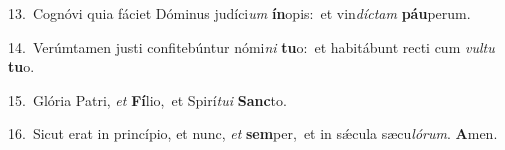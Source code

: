 {\numbfont\textcolor{\numbcolor}{13.}}~Cognóvi quia fáciet Dóminus judíci\textit{um} \textbf{ín}\-opis:~\star et vin\-\textit{díc}\-\textit{tam} \textbf{páu}\-perum.\par
{\numbfont\textcolor{\numbcolor}{14.}}~Verúmtamen justi confitebúntur nómi\textit{ni} \textbf{tu}\-o:~\star et habitábunt recti cum \textit{vul}\-\textit{tu} \textbf{tu}\-o.\par
{\numbfont\textcolor{\numbcolor}{15.}}~Glória Patri, \textit{et} \textbf{Fí}\-lio,~\star et Spirí\-\textit{tu}\-\textit{i} \textbf{Sanc}\-to.\par
{\numbfont\textcolor{\numbcolor}{16.}}~Sicut erat in princípio, et nunc, \textit{et} \textbf{sem}\-per,~\star et in sǽcula sæcu\-\textit{ló}\-\textit{rum}. \textbf{A}\-men.\par
